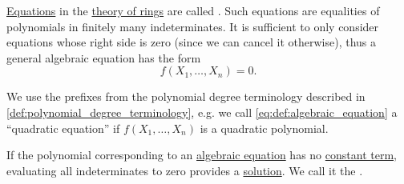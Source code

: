 \begin{definition}\label{def:algebraic_equation}\mimprovised
  \hyperref[def:equation]{Equations} in the \hyperref[def:ring/theory]{theory of rings} are called . Such equations are equalities of polynomials in finitely many indeterminates. It is sufficient to only consider equations whose right side is zero (since we can cancel it otherwise), thus a general algebraic equation has the form
  \begin{equation*}\label{eq:def:algebraic_equation}
    f(X_1, \ldots, X_n) = 0.
  \end{equation*}

  We use the prefixes from the polynomial degree terminology described in \cref{def:polynomial_degree_terminology}, e.g. we call \eqref{eq:def:algebraic_equation} a \enquote{quadratic equation} if \( f(X_1, \ldots, X_n) \) is a quadratic polynomial.
\end{definition}

\begin{definition}\label{def:trivial_solution_of_algebraic_equation}\mimprovised
  If the polynomial corresponding to an \hyperref[def:algebraic_equation]{algebraic equation} has no \hyperref[def:univariate_polynomial]{constant term}, evaluating all indeterminates to zero provides a \hyperref[def:equation/solution]{solution}. We call it the .
\end{definition}

